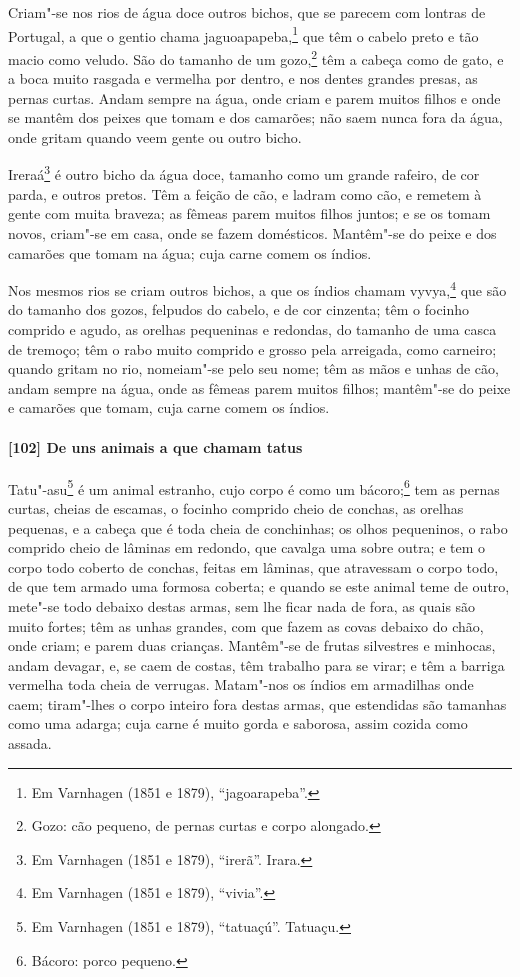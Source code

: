 \begin{linenumbers}
Criam"-se nos rios de água doce outros bichos, que se parecem com lontras de Portugal, a
que o gentio chama jaguoapapeba,\footnote{ Em Varnhagen (1851 e 1879), ``jagoarapeba''.}
que têm o cabelo preto e tão macio como veludo. São do tamanho de um gozo,\footnote{ Gozo:
cão pequeno, de pernas curtas e corpo alongado.} têm a cabeça como de gato, e a boca
muito rasgada e vermelha por dentro, e nos dentes grandes presas, as pernas curtas. Andam
sempre na água, onde criam e parem muitos filhos e onde se mantêm dos peixes que tomam e
dos camarões; não saem nunca fora da água, onde gritam quando veem gente ou outro bicho.

Ireraá\footnote{ Em Varnhagen (1851 e 1879), ``irerã''. Irara.} é outro bicho da água
doce, tamanho como um grande rafeiro, de cor parda, e outros pretos. Têm a feição de cão,
e ladram como cão, e remetem à gente com muita braveza; as fêmeas parem muitos filhos
juntos; e se os tomam novos, criam"-se em casa, onde se fazem domésticos. Mantêm"-se do
peixe e dos camarões que tomam na água; cuja carne comem os índios.

Nos mesmos rios se criam outros bichos, a que os índios chamam vyvya,\footnote{ Em
Varnhagen (1851 e 1879), ``vivia''.} que são do tamanho dos gozos, felpudos do cabelo, e
de cor cinzenta; têm o focinho comprido e agudo, as orelhas pequeninas e redondas, do
tamanho de uma casca de tremoço; têm o rabo muito comprido e grosso pela arreigada, como
carneiro; quando gritam no rio, nomeiam"-se pelo seu nome; têm as mãos e unhas de cão,
andam sempre na água, onde as fêmeas parem muitos filhos; mantêm"-se do peixe e camarões
que tomam, cuja carne comem os índios.

\paragraph{[102] De uns animais a que chamam tatus}\quad
Tatu"-asu\footnote{ Em Varnhagen (1851 e 1879), ``tatuaçú''. Tatuaçu.} é um animal
estranho, cujo corpo é como um bácoro;\footnote{ Bácoro: porco pequeno.} tem as pernas
curtas, cheias de escamas, o focinho comprido cheio de conchas, as orelhas pequenas, e a
cabeça que é toda cheia de conchinhas; os olhos pequeninos, o rabo comprido cheio de
lâminas em redondo, que cavalga uma sobre outra; e tem o corpo todo coberto de conchas,
feitas em lâminas, que atravessam o corpo todo, de que tem armado uma formosa coberta; e
quando se este animal teme de outro, mete"-se todo debaixo destas armas, sem lhe ficar nada
de fora, as quais são muito fortes; têm as unhas grandes, com que fazem as covas debaixo
do chão, onde criam; e parem duas crianças. Mantêm"-se de frutas silvestres e minhocas,
andam devagar, e, se caem de costas, têm trabalho para se virar; e têm a barriga vermelha
toda cheia de verrugas. Matam"-nos os índios em armadilhas onde caem; tiram"-lhes o corpo
inteiro fora destas armas, que estendidas são tamanhas como uma adarga; cuja carne é muito
gorda e saborosa, assim cozida como assada.


\end{linenumbers}
